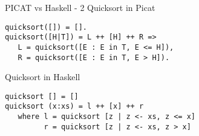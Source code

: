 \iffalse
Qui possiamo vedere un esempio di due programmi uno scritto in PICAT, l'altro in haskell, che ordinano delle liste utilizzando il quicksort. Come possiamo notare grazie al pattern matching e alla list comprehension i due codici sono pressochè uguali.
\fi

\begin{frame}[fragile, shrink=1]{PICAT vs Haskell - 2}
	Quicksort in Picat							
	\begin{lstlisting}
quicksort([]) = [].							
quicksort([H|T]) = L ++ [H] ++ R => 		
   L = quicksort([E : E in T, E <= H]),	
   R = quicksort([E : E in T, E > H]).		
	\end{lstlisting}
\vspace{1cm}
	Quicksort in Haskell
	\begin{lstlisting}
quicksort [] = []
quicksort (x:xs) = l ++ [x] ++ r
   where l = quicksort [z | z <- xs, z <= x]
         r = quicksort [z | z <- xs, z > x]
	\end{lstlisting}
\end{frame}

